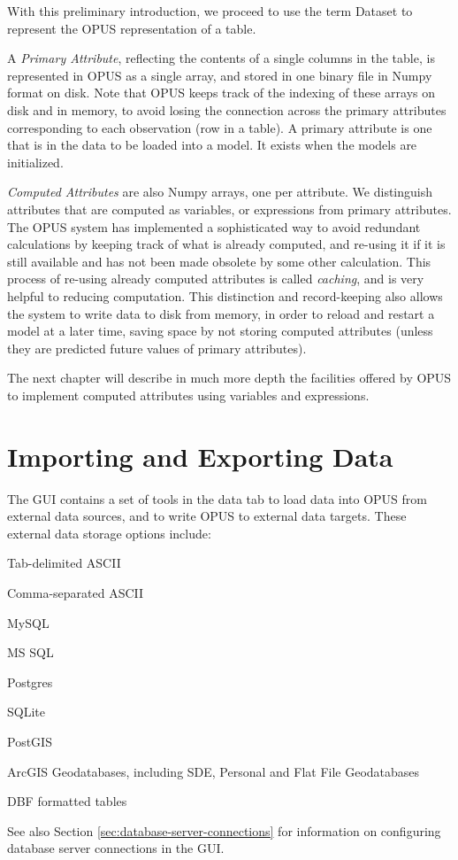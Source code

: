 With this preliminary introduction, we proceed to use the term Dataset to represent the OPUS representation of a table. 

A \emph{Primary Attribute}, reflecting the contents of a single columns in the table, is represented in OPUS as a single array, and stored in one binary file in Numpy format on disk.  Note that OPUS keeps track of the indexing of these arrays on disk and in memory, to avoid losing the connection across the primary attributes corresponding to each observation (row in a table).  A primary attribute is one that is in the data to be loaded into a model.  It exists when the models are initialized.

\emph{Computed Attributes} are also Numpy arrays, one per attribute.  We distinguish attributes that are computed as variables, or expressions from primary attributes.  The OPUS system has implemented a sophisticated way to avoid redundant calculations by keeping track of what is already computed, and re-using it if it is still available and has not been made obsolete by some other calculation.  This process of re-using already computed attributes is called \emph{caching}, and is very helpful to reducing computation.  This distinction and record-keeping also allows the system to write data to disk from memory, in order to reload and restart a model at a later time, saving space by not storing computed attributes (unless they are predicted future values of primary attributes).

The next chapter will describe in much more depth the facilities offered by OPUS to implement computed attributes using variables and expressions.

\section{Importing and Exporting Data}

The GUI contains a set of tools in the data tab to load data into OPUS from external data sources, and to write OPUS to external data targets.  These external data storage options include:

\squishlist
\item Tab-delimited ASCII
\item Comma-separated ASCII
\item MySQL
\item MS SQL
\item Postgres
\item SQLite
\item PostGIS
\item ArcGIS Geodatabases, including SDE, Personal and Flat File Geodatabases
\item DBF formatted tables
\squishend

See also Section \ref{sec:database-server-connections} for information on configuring database server connections in the GUI.